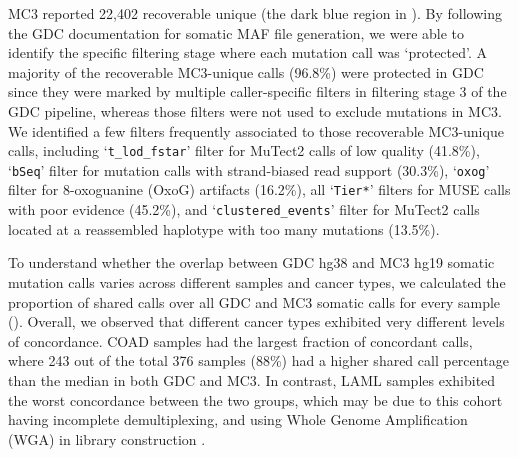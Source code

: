 MC3 reported 22,402 recoverable unique (the dark blue region in ). By following the GDC documentation for somatic MAF file generation, we were able to identify the specific filtering stage where each mutation call was `protected'. A majority of the recoverable MC3-unique calls (96.8\%) were protected in GDC since they were marked by multiple caller-specific filters in filtering stage 3 of the GDC pipeline, whereas those filters were not used to exclude mutations in MC3. We identified a few filters frequently associated to those recoverable MC3-unique calls, including `\texttt{t\_lod\_fstar}' filter for MuTect2 calls of low quality (41.8\%), ‘\texttt{bSeq}’ filter for mutation calls with strand-biased read support (30.3\%), `\texttt{oxog}' filter for 8-oxoguanine (OxoG) artifacts (16.2\%), all `\texttt{Tier*}' filters for MUSE calls with poor evidence (45.2\%), and `\texttt{clustered\_events}' filter for MuTect2 calls located at a reassembled haplotype with too many mutations (13.5\%).

To understand whether the overlap between GDC hg38 and MC3 hg19 somatic mutation calls varies across different samples and cancer types, we calculated the proportion of shared calls over all GDC and MC3 somatic calls for every sample (). Overall, we observed that different cancer types exhibited very different levels of concordance. COAD samples had the largest fraction of concordant calls, where 243 out of the total 376 samples (88\%) had a higher shared call percentage than the median in both GDC and MC3. In contrast, LAML samples exhibited the worst concordance between the two groups, which may be due to this cohort having incomplete demultiplexing, and using Whole Genome Amplification (WGA) in library construction \cite{bodinim_rival:HiddenGenomic2015}.

